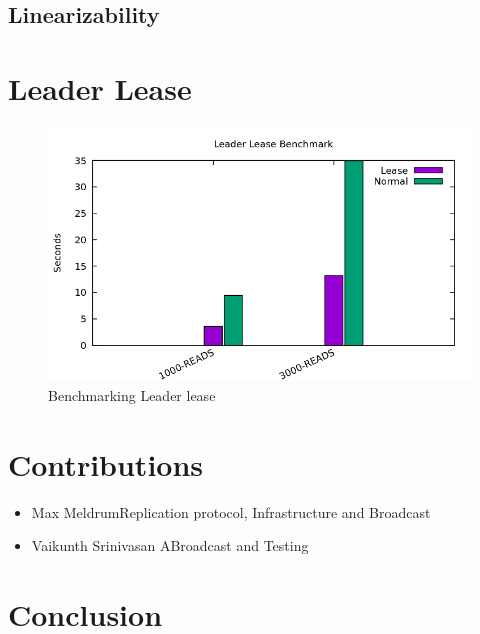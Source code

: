 \documentclass[12pt]{article}
\begin{document}
\subsection{Linearizability}

\section{Leader Lease}

\begin{figure}[H]
  \centering
  \includegraphics[scale=0.6]{img/benchmark.png}
  \caption[Caption for LOF]{Benchmarking Leader lease}  
  \label{fig:picture}
\end{figure}

\section{Contributions}

\begin{itemize}
	\item{Max Meldrum\newline{}\newline{}Replication protocol, Infrastructure and Broadcast}
	\item{Vaikunth Srinivasan A\newline{}\newline{}Broadcast and Testing}

\end{itemize}




\section{Conclusion}



\end{document}
